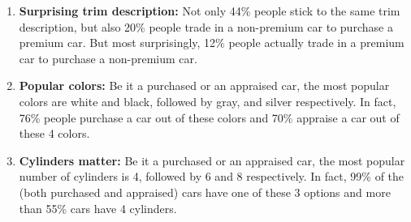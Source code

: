 \documentclass[12 pt]{article}
\begin{document}
\begin{enumerate}
\item \textbf{Surprising trim description:} Not only 44\% people stick to the same trim description, but also 20\% people trade in a non-premium car to purchase a premium car. But most surprisingly, 12\% people actually trade in a premium car to purchase a non-premium car. 
\item \textbf{Popular colors:} Be it a purchased or an appraised car, the most popular colors are white and black, followed by gray, and silver respectively. In fact, 76\% people purchase a car out of these colors and 70\% appraise a car out of these 4 colors.
\item \textbf{Cylinders matter:} Be it a purchased or an appraised car, the most popular number of cylinders is 4, followed by 6 and 8 respectively. In fact, 99\% of the (both purchased and appraised) cars have one of these 3 options and more than 55\% cars have 4 cylinders.
\end{enumerate}
	
	
\end{document}
